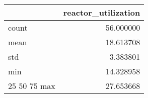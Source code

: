 \begin{tabular}{lr}
\toprule
 & reactor\_utilization \\
\midrule
count & 56.000000 \\
mean & 18.613708 \\
std & 3.383801 \\
min & 14.328958 \\
25%
50%
75%
max & 27.653668 \\
\bottomrule
\end{tabular}

